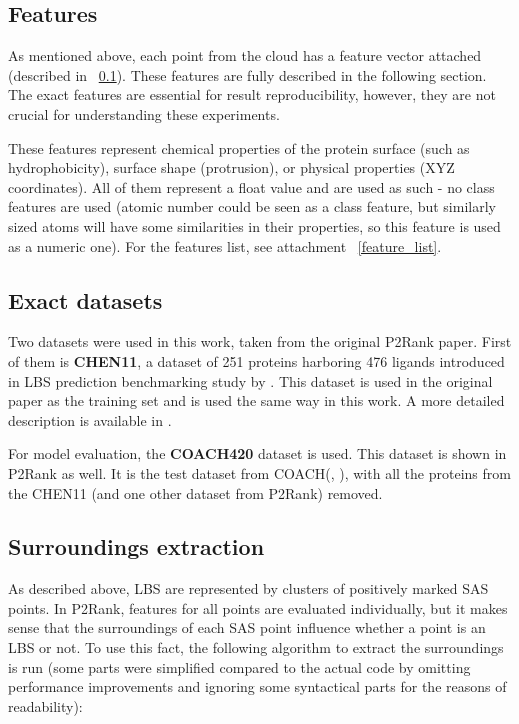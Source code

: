 \subsection{Features}
\label{features_section}

As mentioned above, each point from the cloud has a feature vector attached (described in ~\ref{features_section}). These features are fully described in the following section. The exact features are essential for result reproducibility, however, they are not crucial for understanding these experiments. 

These features represent chemical properties of the protein surface (such as hydrophobicity), surface shape (protrusion), or physical properties (XYZ coordinates). All of them represent a float value and are used as such - no class features are used (atomic number could be seen as a class feature, but similarly sized atoms will have some similarities in their properties, so this feature is used as a numeric one). For the features list, see attachment ~\ref{feature_list}.

\subsection{Exact datasets}

Two datasets were used in this work, taken from the original P2Rank paper. First of them is \textbf{CHEN11}, a dataset of 251 proteins harboring 476 ligands introduced in \ac{LBS} prediction benchmarking study by \cite{chen11}. This dataset is used in the original paper as the training set and is used the same way in this work. A more detailed description is available in \cite{chen11}.

For model evaluation, the \textbf{COACH420} dataset is used. This dataset is shown in P2Rank as well. It is the test dataset from COACH(\cite{coach1}, \cite{coach2}), with all the proteins from the CHEN11 (and one other dataset from P2Rank) removed. 

\subsection{Surroundings extraction}
\label{Surroundings}

As described above, \ac{LBS} are represented by clusters of positively marked \ac{SAS} points. In P2Rank, features for all points are evaluated individually, but it makes sense that the surroundings of each SAS point influence whether a point is an LBS or not. To use this fact, the following algorithm to extract the surroundings is run (some parts were simplified compared to the actual code by omitting performance improvements and ignoring some syntactical parts for the reasons of readability):

